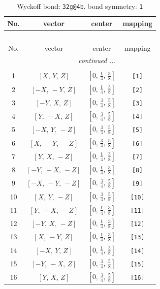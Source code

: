 \documentclass[fleqn,8pt]{jsarticle}
\begin{document}
\begin{longtable}{cccc}
\caption{Wyckoff bond: {\tt 32g@4b}, bond symmetry: {\tt 1}}
 \\
 \hline \hline
No. & vector & center & mapping \\ \hline \endfirsthead

\multicolumn{3}{l}{\tablename\ \thetable{}} \\
 \hline \hline
No. & vector & center & mapping \\ \hline \endhead

 \hline \hline
\multicolumn{3}{r}{\footnotesize\it continued ...} \\ \endfoot

 \hline \hline
\multicolumn{3}{r}{} \\ \endlastfoot

1 & $\left[ X,\, Y,\, Z \right]$ & $\left[ 0,\, \frac{1}{4},\, \frac{3}{8} \right]$ & {\tt [1]} \\ \hline
2 & $\left[ - X,\, - Y,\, Z \right]$ & $\left[ 0,\, \frac{1}{4},\, \frac{3}{8} \right]$ & {\tt [2]} \\ \hline
3 & $\left[ - Y,\, X,\, Z \right]$ & $\left[ 0,\, \frac{3}{4},\, \frac{5}{8} \right]$ & {\tt [3]} \\ \hline
4 & $\left[ Y,\, - X,\, Z \right]$ & $\left[ 0,\, \frac{3}{4},\, \frac{5}{8} \right]$ & {\tt [4]} \\ \hline
5 & $\left[ - X,\, Y,\, - Z \right]$ & $\left[ 0,\, \frac{3}{4},\, \frac{5}{8} \right]$ & {\tt [5]} \\ \hline
6 & $\left[ X,\, - Y,\, - Z \right]$ & $\left[ 0,\, \frac{3}{4},\, \frac{5}{8} \right]$ & {\tt [6]} \\ \hline
7 & $\left[ Y,\, X,\, - Z \right]$ & $\left[ 0,\, \frac{1}{4},\, \frac{3}{8} \right]$ & {\tt [7]} \\ \hline
8 & $\left[ - Y,\, - X,\, - Z \right]$ & $\left[ 0,\, \frac{1}{4},\, \frac{3}{8} \right]$ & {\tt [8]} \\ \hline
9 & $\left[ - X,\, - Y,\, - Z \right]$ & $\left[ 0,\, \frac{3}{4},\, \frac{5}{8} \right]$ & {\tt [9]} \\ \hline
10 & $\left[ X,\, Y,\, - Z \right]$ & $\left[ 0,\, \frac{3}{4},\, \frac{5}{8} \right]$ & {\tt [10]} \\ \hline
11 & $\left[ Y,\, - X,\, - Z \right]$ & $\left[ 0,\, \frac{1}{4},\, \frac{3}{8} \right]$ & {\tt [11]} \\ \hline
12 & $\left[ - Y,\, X,\, - Z \right]$ & $\left[ 0,\, \frac{1}{4},\, \frac{3}{8} \right]$ & {\tt [12]} \\ \hline
13 & $\left[ X,\, - Y,\, Z \right]$ & $\left[ 0,\, \frac{1}{4},\, \frac{3}{8} \right]$ & {\tt [13]} \\ \hline
14 & $\left[ - X,\, Y,\, Z \right]$ & $\left[ 0,\, \frac{1}{4},\, \frac{3}{8} \right]$ & {\tt [14]} \\ \hline
15 & $\left[ - Y,\, - X,\, Z \right]$ & $\left[ 0,\, \frac{3}{4},\, \frac{5}{8} \right]$ & {\tt [15]} \\ \hline
16 & $\left[ Y,\, X,\, Z \right]$ & $\left[ 0,\, \frac{3}{4},\, \frac{5}{8} \right]$ & {\tt [16]} \\
\end{longtable}
\end{document}
